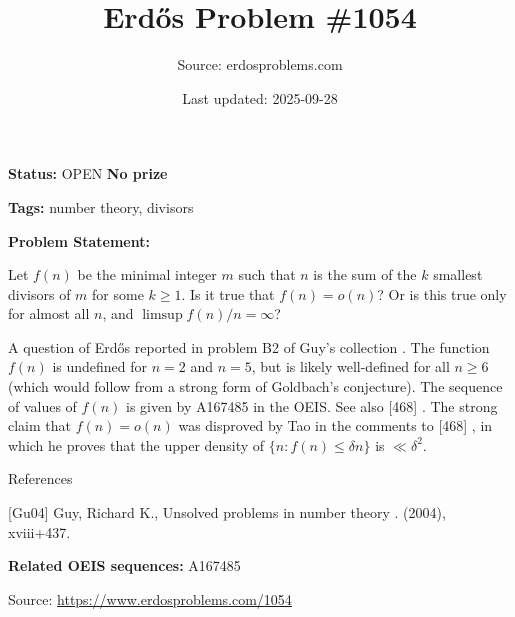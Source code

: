 \documentclass{article}
\title{Erd\H{o}s Problem \#1054}
\date{Last updated: 2025-09-28}
\author{Source: erdosproblems.com}
\begin{document}
\maketitle

\noindent\textbf{Status:} OPEN \quad \textbf{No prize}

\noindent\textbf{Tags:} number theory, divisors

\medskip

\noindent\textbf{Problem Statement:}

Let $f(n)$ be the minimal integer $m$ such that $n$ is the sum of the $k$ smallest divisors of $m$ for some $k\geq 1$. Is it true that $f(n)=o(n)$? Or is this true only for almost all $n$, and $\limsup f(n)/n=\infty$?




A question of Erd\H{o}s reported in problem B2 of Guy's collection \cite{Gu04}. The function $f(n)$ is undefined for $n=2$ and $n=5$, but is likely well-defined for all $n\geq 6$ (which would follow from a strong form of Goldbach's conjecture). The sequence of values of $f(n)$ is given by A167485 in the OEIS. See also [468] . The strong claim that $f(n)=o(n)$ was disproved by Tao in the comments to [468] , in which he proves that the upper density of $\{ n : f(n)\leq \delta n\}$ is $\ll \delta^2$.




References

[Gu04] Guy, Richard K., Unsolved problems in number theory . (2004), xviii+437.

\noindent\textbf{Related OEIS sequences:} A167485


\bigskip
\noindent\small{Source: \url{https://www.erdosproblems.com/1054}}
\end{document}
